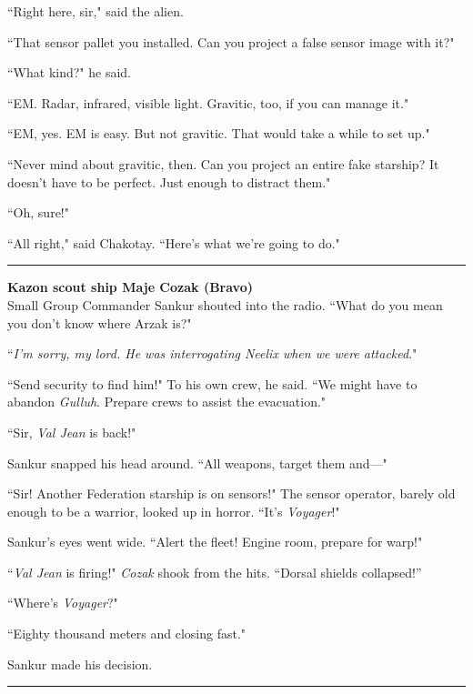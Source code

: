 \documentclass[twoside,letterpaper,12pt]{memoir}
\begin{document}
``Right here, sir," said the alien.

``That sensor pallet you installed. Can you project a false sensor image with it?"

``What kind?" he said.

``EM. Radar, infrared, visible light. Gravitic, too, if you can manage it."

``EM, yes. EM is easy. But not gravitic. That would take a while to set up."

``Never mind about gravitic, then. Can you project an entire fake starship? It doesn't have to be perfect. Just enough to distract them."

``Oh, sure!"

``All right," said Chakotay. ``Here's what we're going to do."

\begin{center}\rule{3cm}{0.4 pt}\end{center}

\noindent\textbf{Kazon scout ship Maje Cozak (Bravo)}\\

Small Group Commander Sankur shouted into the radio. ``What do you mean you don't know where Arzak is?"

``\textit{I'm sorry, my lord. He was interrogating Neelix when we were attacked}."

``Send security to find him!" To his own crew, he said. ``We might have to abandon \textit{Gulluh}. Prepare crews to assist the evacuation."

``Sir, \textit{Val Jean} is back!"

Sankur snapped his head around. ``All weapons, target them and---"

``Sir! Another Federation starship is on sensors!" The sensor operator, barely old enough to be a warrior, looked up in horror. ``It's \textit{Voyager}!"

Sankur's eyes went wide. ``Alert the fleet! Engine room, prepare for warp!"

``\textit{Val Jean} is firing!" \textit{Cozak} shook from the hits. “Dorsal shields collapsed!”

``Where's \textit{Voyager}?"

``Eighty thousand meters and closing fast."

Sankur made his decision.

\begin{center}\rule{3cm}{0.4 pt}\end{center}
\end{document}
